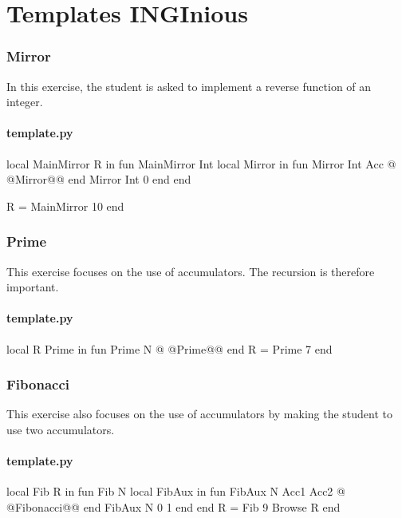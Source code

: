 \documentclass[11pt,a4paper,twoside,openright]{report}
\begin{document}
\chapter{Templates INGInious}
\subsection{Mirror}


In this exercise, the student is asked to implement a reverse function of an 
integer. 


\subsubsection*{template.py}
\begin{OZ}
local MainMirror R in
	fun {MainMirror Int}
    	local Mirror in
        	fun {Mirror Int Acc}
@	@Mirror@@
	        end
    	    {Mirror Int 0}
	    end
	end
    
R = {MainMirror 10}
end
    

\end{OZ}

\subsection{Prime}

This exercise focuses on the use of accumulators. The recursion is therefore 
important. 

\subsubsection*{template.py}
\begin{OZ}
local R Prime in
	fun {Prime N}
@	@Prime@@
	end
	R = {Prime 7}
end
\end{OZ}

\subsection{Fibonacci}
This exercise also focuses on the use of accumulators by making the student 
to use two accumulators.

\subsubsection*{template.py}
\begin{OZ}
local Fib R in
    fun {Fib N}
        local FibAux in
            fun {FibAux N Acc1 Acc2}
@	@Fibonacci@@
            end
            {FibAux N 0 1}
    	end
    end
    R = {Fib 9}
	{Browse R}
end
\end{OZ}
\end{document}
